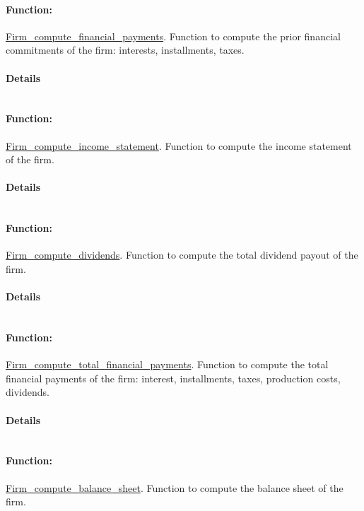 \documentclass[a4paper,11pt]{article}
\begin{document}
\paragraph{Function:}\url{Firm_compute_financial_payments}.
Function to compute the prior financial commitments of the firm: interests, installments, taxes.
\paragraph{Details}
\begin{verbatim}
\end{verbatim}
\paragraph{Function:}\url{Firm_compute_income_statement}.
Function to compute the income statement of the firm.
\paragraph{Details}
\begin{verbatim}
\end{verbatim}
\paragraph{Function:}\url{Firm_compute_dividends}.
Function to compute the total dividend payout of the firm.
\paragraph{Details}
\begin{verbatim}
\end{verbatim}
\paragraph{Function:}\url{Firm_compute_total_financial_payments}.
Function to compute the total financial payments of the firm: interest, installments, taxes, production costs, dividends.
\paragraph{Details}
\begin{verbatim}
\end{verbatim}
\paragraph{Function:}\url{Firm_compute_balance_sheet}.
Function to compute the balance sheet of the firm.
\end{document}
